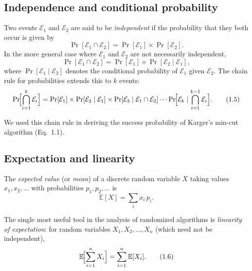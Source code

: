 \documentclass[twoside,12pt]{book}
\theoremstyle{plain}
\theoremstyle{definition}
\theoremstyle{remark}
\begin{document}
\subsection{Independence and conditional probability}

Two events $\mathcal{E}_1$ and $\mathcal{E}_2$ are said to be
\emph{independent} if the probability that they both occur is given by
\begin{equation*}
  \Pr[\mathcal{E}_1 \cap \mathcal{E}_2]
  = \Pr[\mathcal{E}_1] \times \Pr[\mathcal{E}_2].
  \tag{1.3}
\end{equation*}
In the more general case where $\mathcal{E}_1$ and $\mathcal{E}_2$ are not
necessarily independent,
\begin{equation*}
  \Pr[\mathcal{E}_1 \cap \mathcal{E}_2]
  = \Pr[\mathcal{E}_1] \times \Pr[\mathcal{E}_2 \mid \mathcal{E}_1],
  \tag{1.4}
\end{equation*}
where $\Pr[\mathcal{E}_1 \mid \mathcal{E}_2]$ denotes the conditional
probability of $\mathcal{E}_1$ given $\mathcal{E}_2$. The chain rule for
probabilities extends this to $k$ events:
\begin{equation*}
  \Pr\!\Bigl[\bigcap_{i=1}^{k} \mathcal{E}_i\Bigr]
  = \Pr[\mathcal{E}_1]
    \times \Pr[\mathcal{E}_2 \mid \mathcal{E}_1]
    \times \Pr[\mathcal{E}_3 \mid \mathcal{E}_1 \cap \mathcal{E}_2]
    \cdots
    \Pr\!\Bigl[\mathcal{E}_k \mid \bigcap_{i=1}^{k-1} \mathcal{E}_i\Bigr].
  \tag{1.5}
\end{equation*}

We used this chain rule in deriving the success probability of Karger's
min-cut algorithm (Eq.~1.1).

\subsection{Expectation and linearity}

The \emph{expected value} (or \emph{mean}) of a discrete random variable
$X$ taking values $x_1, x_2, \ldots$ with probabilities $p_1, p_2,
\ldots$ is
\[
  \mathbb{E}[X] = \sum_{i} x_i \, p_i.
\]

The single most useful tool in the analysis of randomized algorithms is
\emph{linearity of expectation}: for random variables $X_1, X_2, \ldots,
X_n$ (which need not be independent),
\begin{equation*}
  \mathbb{E}\!\Bigl[\sum_{i=1}^{n} X_i\Bigr]
  = \sum_{i=1}^{n} \mathbb{E}[X_i].
  \tag{1.6}
\end{equation*}
\end{document}
